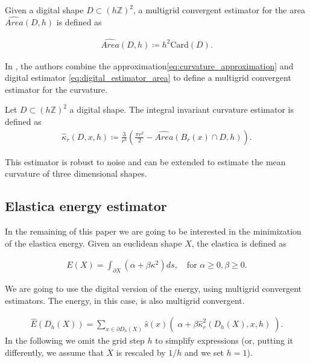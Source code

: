 \documentclass[runningheads]{llncs}
\begin{document}
\begin{definition}	
  Given a digital shape $D \subset (h \mathbb{Z})^2$, a multigrid convergent estimator for the area $\widehat{Area}(D,h)$ is defined as	
		
  \begin{align}
    \widehat{Area}(D,h) \coloneqq h^2\text{Card}\left( D \right).	
    \label{eq:digital_estimator_area}
  \end{align}
\end{definition}
	
In \cite{coeurjolly13}, the authors combine the approximation\eqref{eq:curvature_approximation} and digital estimator
\eqref{eq:digital_estimator_area} to define a multigrid convergent estimator for the curvature.

\begin{definition}
  Let $D \subset (h \mathbb{Z})^2$ a digital shape. The integral invariant curvature estimator is defined as
  \begin{align*}
    \hat{\kappa}_{r}(D,x,h) \coloneqq \frac{3}{r^3} \left( \frac{\pi r^2}{2} - \widehat{Area} \left( B_{r} ( x ) \cap D, h \right) \right).
  \end{align*}
\end{definition}


This estimator is robust to noise and can be extended to estimate the mean curvature of three dimensional shapes.

\subsection{Elastica energy estimator}

In the remaining of this paper we are going to be interested in the minimization of the elastica energy. Given an euclidean shape $X$, the elastica is defined as

\begin{align*}
  E(X) = \int_{\partial X}{(\alpha + \beta \kappa^2) ds}, \quad \text{for~} \alpha \ge 0, \beta \ge 0.
\end{align*}

We are going to use the digital version of the energy, using multigrid convergent estimators. The energy, in this case, is also multigrid convergent.


\begin{align}
	\hat{E}( D_h(X) ) = \sum_{x \in \partial D_h(X)}{ \hat{s}(x)\left(\; \alpha + \beta \hat{\kappa}_{r}^2(D_h(X),x,h) \; \right)}.
	\label{eq:digital-energy}
\end{align}
 In the following we omit the grid step $h$ to simplify expressions (or, putting it differently, we assume that $X$ is rescaled by $1/h$ and we set $h=1$).
\end{document}
